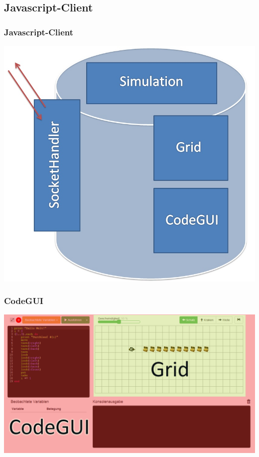 \subsection{Javascript-Client}

\begin{frame}
\frametitle{Javascript-Client}
\begin{center}
	\includegraphics[scale=0.3]{client/modules.jpg}
\end{center}
\end{frame}

\begin{frame}
\frametitle{CodeGUI}
\begin{center}
	\includegraphics[scale=0.35]{client/client-markiert.png}
\end{center}
\end{frame}

